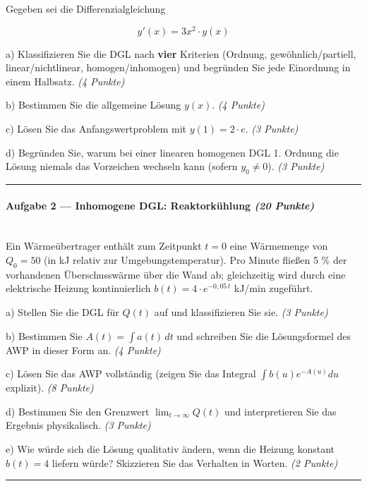 \documentclass[11pt, a4paper]{article}
\begin{document}
Gegeben sei die Differenzialgleichung

\[
y'(x) = 3x^2 \cdot y(x)
\]


a) Klassifizieren Sie die DGL nach \textbf{vier} Kriterien (Ordnung, gewöhnlich/partiell, linear/nichtlinear, homogen/inhomogen) und begründen Sie jede Einordnung in einem Halbsatz. \textit{(4 Punkte)}


b) Bestimmen Sie die allgemeine Lösung $y(x)$. \textit{(4 Punkte)}


c) Lösen Sie das Anfangswertproblem mit $y(1) = 2 \cdot e$. \textit{(3 Punkte)}


d) Begründen Sie, warum bei einer linearen homogenen DGL 1. Ordnung die Lösung niemals das Vorzeichen wechseln kann (sofern $y_0 \neq 0$). \textit{(3 Punkte)}



\noindent\textcolor{rulegray}{\rule{\linewidth}{0.4pt}}


\paragraph{Aufgabe 2 — Inhomogene DGL: Reaktorkühlung \textit{(20 Punkte)}}\mbox{}\\[2pt]

Ein Wärmeübertrager enthält zum Zeitpunkt $t = 0$ eine Wärmemenge von $Q_0 = 50$ (in kJ relativ zur Umgebungstemperatur). Pro Minute fließen 5 \% der vorhandenen Überschusswärme über die Wand ab; gleichzeitig wird durch eine elektrische Heizung kontinuierlich $b(t) = 4 \cdot e^{-0{,}05\,t}$ kJ/min zugeführt.


a) Stellen Sie die DGL für $Q(t)$ auf und klassifizieren Sie sie. \textit{(3 Punkte)}


b) Bestimmen Sie $A(t) = \int a(t)\,dt$ und schreiben Sie die Lösungsformel des AWP in dieser Form an. \textit{(4 Punkte)}


c) Lösen Sie das AWP vollständig (zeigen Sie das Integral $\int b(u) e^{-A(u)} du$ explizit). \textit{(8 Punkte)}


d) Bestimmen Sie den Grenzwert $\lim_{t \to \infty} Q(t)$ und interpretieren Sie das Ergebnis physikalisch. \textit{(3 Punkte)}


e) Wie würde sich die Lösung qualitativ ändern, wenn die Heizung konstant $b(t) = 4$ liefern würde? Skizzieren Sie das Verhalten in Worten. \textit{(2 Punkte)}



\noindent\textcolor{rulegray}{\rule{\linewidth}{0.4pt}}
\end{document}
